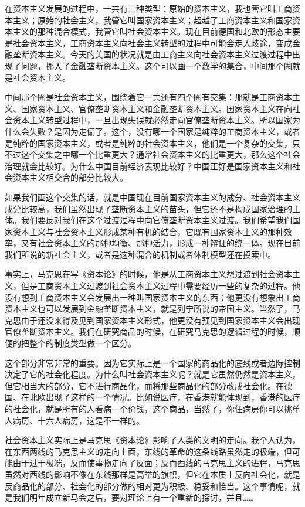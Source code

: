 \documentclass[UTF8, 12pt, a4paper]{ctexrep}
\begin{document}
在资本主义发展的过程中，一共有三种类型：原始的资本主义，我也管它叫工商资本主义；原始的社会主义，我管它叫国家资本主义；超越了工商资本主义和国家资本主义的那种混合模式，我管它叫社会资本主义。现在目前德国和北欧的形态主要是社会资本主义，工商资本主义向社会主义转型的过程中可能会走入歧途，变成金融垄断资本主义。今天的美国的状况就是由工商主义向社会资本主义过渡过程中出现了问题，挪入了金融垄断资本主义。这个可以画一个数学的集合，中间那个圈就是社会资本主义。

中间那个圈是社会资本主义，围绕着它一共还有四个圈有交集：那就是工商资本主义、国家资本主义、官僚垄断资本主义和金融垄断资本主义。国家资本主义在向社会资本主义转型过程中，一旦出现失误就必然走向官僚垄断资本主义。所以国家为什么会失败？是因为走偏了。这个，没有哪一个国家是纯粹的工商资本主义，或者是纯粹的国家资本主义，或者是纯粹的社会资本主义，他们是一个复杂的交集，只不过这个交集之中哪一个比重更大？通常社会资本主义的比重更大，那么这个社会治理就会比较好。为什么中国目前经济表现比较好？中国正好是国家资本主义和社会资本主义相交合的部分比较大。

如果我们画这个交集的话，就是中国现在目前国家资本主义的成分、社会资本主义成分比较高，我们虽然出现了垄断资本主义的苗头，但它还不是构成国家治理的主体。我们要反对我们在这个过渡过程中向官僚垄断资本主义过渡。我们希望我们国家资本主义与社会资本主义形成某种有机的结合，它既有国家资本主义的那种效率，又有社会资本主义的那种均衡、那种活力，形成一种辩证的统一体。现在目前我们所说的新社会主义，或者是这种混合的机制或者体制模型还在摸索中。

事实上，马克思在写《资本论》的时候，他是从工商资本主义想过渡到社会资本主义，但是工商资本主义过渡到社会资本主义过程中需要经历一些的复杂的过程。他没有想到工商资本主义会发展出一种叫国家资本主义的东西；他更没有想象出工商资本主义也可以发展到金融垄断资本主义，就是列宁所说的帝国主义。当然了，马克思由于还没来得及见到国家资本主义形式，他更没有预见到国家资本主义会出现官僚垄断资本主义。我们在研究商品的时候，在研究马克思的逻辑过程的时候，顺便的把整个的制度类型做一个区分。

这个部分非常非常的重要。因为它实际上是一个国家的商品化的底线或者边际控制决定了它的社会化程度。为什么叫社会资本主义呢？就是它虽然仍然是资本主义，但它相当大的部分，它不进行商品化，而将那些商品化的部分改成社会化。在德国、在北欧出现了这样的一个情况。比如说医疗，在香港就能体现到，香港的医疗的社会化，就是所有的人看病一个价钱，这个商品，当然了，你住病房你可以挑单人病房、十六人病房，这是不一样的。

社会资本主义实际上是马克思《资本论》影响了人类的文明的走向。我个人认为，在东西两线的马克思主义的走向上面，东线的革命的这条线路虽然走的极端，但可能由于过于极端，反而使事物走向了反面；反而西线的马克思主义的进程，马克思虽然对西线的影响不像在东线那样是高举的旗帜，但它在本质上反向社会化，就是反商品化的部分、社会化的部分做的相对更为积极、稳妥和恰当。这个事情呢，就是我们明年成立新马会之后，要对理论上有一个重新的探讨，并且……
\end{document}

